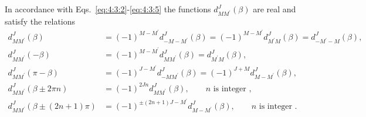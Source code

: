 In accordance with Eqs.~\eqref{eq:4:3:2}-\eqref{eq:4:3:5} the functions $d_{M M^{\prime}}^{J}(\beta)$ are real and satisfy the relations
\begin{equation}
\begin{aligned}
d_{M M^{\prime}}^{J}(\beta) & =(-1)^{M-M^{\prime}} d_{-M-M^{\prime}}^{J}(\beta)=(-1)^{M-M^{\prime}} d_{M^{\prime} M}^{J}(\beta)=d_{-M^{\prime}-M}^{J}(\beta), \\
d_{M M^{\prime}}^{J}(-\beta) & =(-1)^{M-M^{\prime}} d_{M M^{\prime}}^{J}(\beta)=d_{M^{\prime} M}^{J}(\beta), \\
d_{M M^{\prime}}^{J}(\pi-\beta) & =(-1)^{J-M^{\prime}} d_{-M M^{\prime}}^{J}(\beta)=(-1)^{J+M} d_{M-M^{\prime}}^{J}(\beta), \\
d_{M M^{\prime}}^{J}(\beta \pm 2 \pi n) & =(-1)^{2 J n} d_{M M^{\prime}}^{J}(\beta),  \qquad n \text { is integer },  \label{eq:4:4:1}\\
d_{M M^{\prime}}^{J}(\beta \pm(2 n+1) \pi) & =(-1)^{ \pm(2 n+1) J-M^{\prime}} d_{M-M^{\prime}}^{J}(\beta), \qquad  n \text { is integer }.
\end{aligned}
\end{equation}
